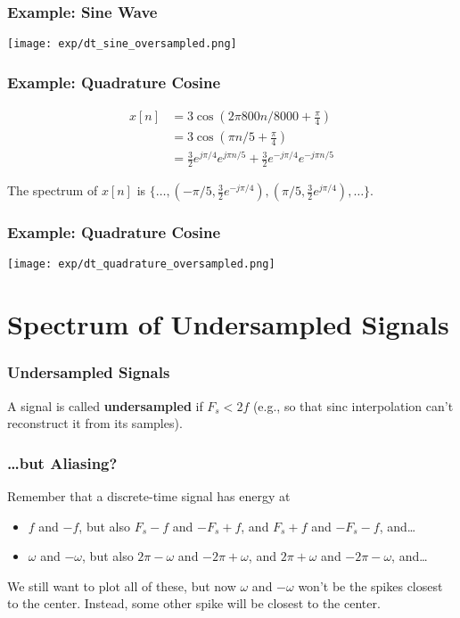 \documentclass{beamer}
\begin{document}
\begin{frame}
  \frametitle{Example: Sine Wave}

  \centerline{\texttt{[image: exp/dt\_sine\_oversampled.png]}}
\end{frame}

\begin{frame}
  \frametitle{Example: Quadrature Cosine}

  \begin{align*}
    x[n] &= 3\cos\left(2\pi 800n/8000+\frac{\pi}{4}\right)\\
    &= 3\cos\left(\pi n/5+\frac{\pi}{4}\right)\\
    &= \frac{3}{2}e^{j\pi/4}e^{j\pi n/5} + \frac{3}{2}e^{-j\pi/4}e^{-j\pi n/5}
  \end{align*}

  The spectrum of $x[n]$ is $\{\ldots,(-\pi/5,\frac{3}{2}e^{-j\pi/4}),(\pi/5,\frac{3}{2}e^{j\pi/4}),\ldots\}$.
\end{frame}

\begin{frame}
  \frametitle{Example: Quadrature Cosine}

  \centerline{\texttt{[image: exp/dt\_quadrature\_oversampled.png]}}
\end{frame}

\section[Undersampled]{Spectrum of Undersampled Signals}
\setcounter{subsection}{1}

\begin{frame}
  \frametitle{Undersampled Signals}

  A signal is called {\bf undersampled} if $F_s<2f$ (e.g., so that sinc
  interpolation can't reconstruct it from its samples).
\end{frame}

\begin{frame}
  \frametitle{\ldots but Aliasing?}

  Remember that a discrete-time signal has energy at
  \begin{itemize}
  \item $f$ and $-f$, but also $F_s-f$ and $-F_s+f$, and $F_s+f$ and $-F_s-f$, and\ldots
  \item $\omega$ and $-\omega$, but also $2\pi-\omega$ and $-2\pi+\omega$,
    and $2\pi+\omega$ and $-2\pi-\omega$, and\ldots
  \end{itemize}
  We still want to plot all of these, but now $\omega$ and $-\omega$
  won't be the spikes closest to the center.  Instead, some other
  spike will be closest to the center.
\end{frame}
\end{document}

